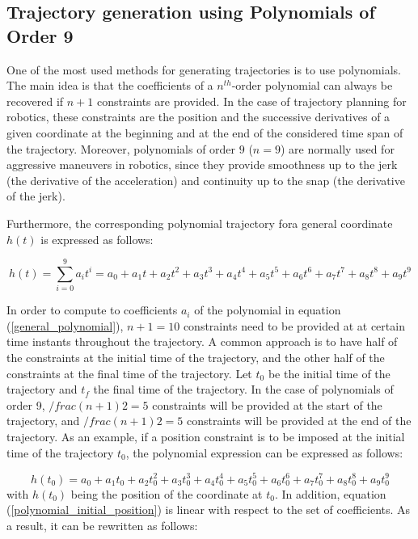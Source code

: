 \documentclass{thesisreport}
\begin{document}
\subsection{Trajectory generation using Polynomials of Order 9}\label{trajectory_generation_using_pol_of_order_9}

One of the most used methods for generating trajectories is to use polynomials. The main idea is that the coefficients of a $n^{th}$-order polynomial can always be recovered if $n+1$ constraints are provided. In the case of trajectory planning for robotics, these constraints are the position and the successive derivatives of a given coordinate at the beginning and at the end of the considered time span of the trajectory. Moreover, polynomials of order $9$ ($n=9$) are normally used for aggressive maneuvers in robotics, since they provide smoothness up to the jerk (the derivative of the acceleration) and continuity up to the snap (the derivative of the jerk). 

\newpage

Furthermore, the corresponding polynomial trajectory fora general coordinate $h(t)$ is expressed as follows: 

\begin{equation}\label{general_polynomial}
	h(t) = \sum_{i=0}^{9} a_i t^i = a_0 + a_1 t + a_2 t^2 + a_3 t^3 + a_4 t^4 + a_5 t^5 + a_6 t^6 + a_7 t^7 + a_8 t^8 + a_9 t^9
\end{equation}

In order to compute to coefficients $a_i$ of the polynomial in equation (\ref{general_polynomial}), $n+1=10$ constraints need to be provided at at certain time instants throughout the trajectory. A common approach is to have half of the constraints at the initial time of the trajectory, and the other half of the constraints at the final time of the trajectory. Let $t_0$ be the initial time of the trajectory and $t_f$ the final time of the trajectory. In the case of polynomials of order 9, $/frac{(n+1)}{2}=5$ constraints will be provided at the start of the trajectory, and  $/frac{(n+1)}{2}=5$ constraints will be provided at the end of the trajectory. As an example, if a position constraint is to be imposed at the initial time of the trajectory $t_0$, the polynomial expression can be expressed as follows: 

\begin{equation}\label{polynomial_initial_position}
	h(t_0) = a_0 + a_1 t_0 + a_2 t_0^2 + a_3 t_0^3 + a_4 t_0^4 + a_5 t_0^5 + a_6 t_0^6 + a_7 t_0^7 + a_8 t_0^8 + a_9 t_0^9
\end{equation} 
with $h(t_0)$ being the position of the coordinate at $t_0$. In addition, equation (\ref{polynomial_initial_position}) is linear with respect to the set of coefficients. As a result, it can be rewritten as follows:
\end{document}
